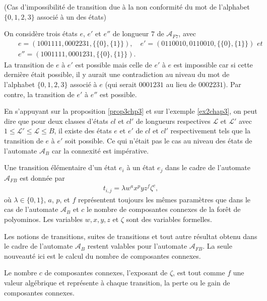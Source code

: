 \begin{Ex} (Cas d'impossibilité de transition due à la non conformité du mot de l'alphabet $\{0,1,2,3\}$ associé à un des états)\label{ex2chap3}
 
 On considère trois états   $e$, $e'$ et $e''$ de longueur $7$ de $\mathcal{A}_{F7}$, avec
 \begin{eqnarray*}
& & e = (1001111,0002231,\{\{0\},\{1\}\}), \quad  e' = (0110010,0110010,\{\{0\},\{1\}\}) \textit{ et } \\
& & e''= (1001111,0001231,\{\{0\},\{1\}\}).
 \end{eqnarray*}
 La transition de $e$ à $e'$ est possible mais celle de $e'$ à $e$ est impossible car si cette dernière était possible, il y aurait une contradiction au niveau du mot de l'alphabet $\{0,1,2,3\}$ associé à $e$ (qui serait $0001231$ au lieu de $0002231$). Par contre, la transition de $e'$ à $e''$ est possible.
\end{Ex}
En s'appuyant sur la proposition \ref{prop3chp3} et sur l'exemple \ref{ex2chap3}, on peut dire que  pour deux classes d'états  $cl$ et $cl'$ de longueurs respectives $\mathcal{L}$ et $\mathcal{L}'$ avec $1\leq \mathcal{L}'\leq \mathcal{L} \leq B$, il existe des états $e$ et $e'$ de $cl$ et $cl'$  respectivement tels que la transition de $e$ à $e'$ soit possible. Ce qui n'était pas le cas au niveau des états de l'automate $\mathcal{A}_{B}$ car la connexité est impérative.


\begin{Def}\label{defchp3711}
Une transition élémentaire d'un état $e_{i}$ à un état $e_{j}$ dans le  cadre de l'automate $\mathcal{A}_{FB}$ est donnée par 
\begin{eqnarray*}\label{transel2}
t_{i,j} =\lambda w^{a}x^{p}yz^{f}\zeta^{c},
\end{eqnarray*}
où $\lambda\in \{0,1\}$, $a$, $p$,  et $f$ représentent toujours les mêmes paramètres que dans le cas de l'automate $\mathcal{A}_{B}$ et $c$ le nombre de composantes connexes de la forêt de polyominos. Les variables $w,x,y,z$ et $\zeta$ sont des variables formelles.
\end{Def} 

\begin{Rem}\label{remchap3711}
Les notions de transitions, suites de transitions et tout autre résultat obtenu dans le cadre de l'automate  $\mathcal{A}_{B}$ restent valables  pour l'automate $\mathcal{A}_{FB}$. La seule nouveauté ici est le calcul du nombre de composantes  connexes.
\end{Rem}
Le nombre $c$ de composantes connexes, l'exposant de $\zeta$, est tout comme $f$ une valeur algébrique  et représente à chaque transition, la perte ou le gain de composantes connexes. 

